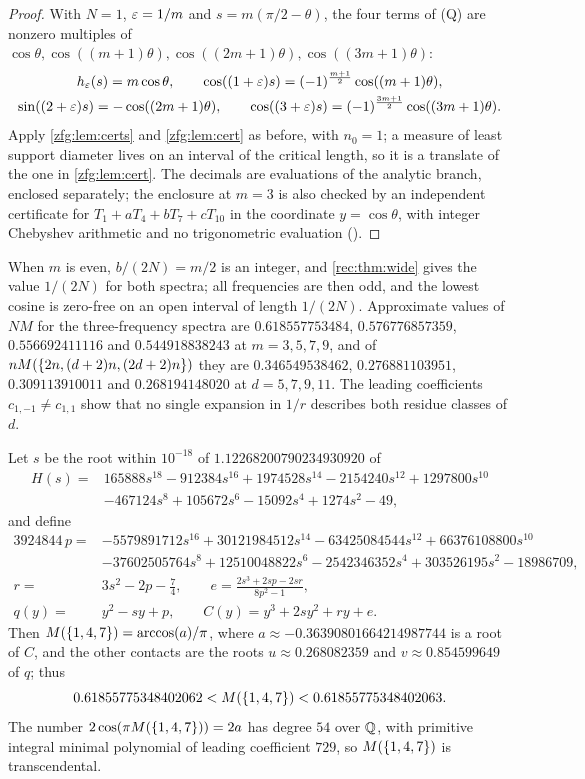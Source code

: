 \begin{proof}
With $N=1$, $\varepsilon=1/m$ and $s=m(\pi/2-\theta)$, the four terms of (Q) are nonzero multiples of
$\cos\theta,\cos((m+1)\theta),\cos((2m+1)\theta),\cos((3m+1)\theta)$:
\begin{gather*}
 h_\varepsilon(s)=m\cos\theta,\qquad \cos((1+\varepsilon)s)=(-1)^{\frac{m+1}2}\cos((m+1)\theta),\\
 \sin((2+\varepsilon)s)=-\cos((2m+1)\theta),\qquad \cos((3+\varepsilon)s)=(-1)^{\frac{3m+1}2}\cos((3m+1)\theta).
\end{gather*}
Apply \cref{zfg:lem:certs} and \cref{zfg:lem:cert} as before, with $n_0=1$; a measure of least support diameter lives on an
interval of the critical length, so it is a translate of the one in \cref{zfg:lem:cert}. The decimals are evaluations
of the analytic branch, enclosed separately; the enclosure at $m=3$ is also checked by an independent certificate for
$T_1+aT_4+bT_7+cT_{10}$ in the coordinate $y=\cos\theta$, with integer Chebyshev arithmetic and no trigonometric evaluation
().
\end{proof}

When $m$ is even, $b/(2N)=m/2$ is an integer, and \cref{rec:thm:wide} gives the value $1/(2N)$ for both spectra; all
frequencies are then odd, and the lowest cosine is zero-free on an open interval of length $1/(2N)$. Approximate
values of $NM$ for the three-frequency spectra are $0.618557753484$, $0.576776857359$, $0.556692411116$ and
$0.544918838243$ at $m=3,5,7,9$, and of $nM(\{2n,(d+2)n,(2d+2)n\})$ they are $0.346549538462$, $0.276881103951$,
$0.309113910011$ and $0.268194148020$ at $d=5,7,9,11$. The leading coefficients $c_{1,-1}\ne c_{1,1}$ show that no single
expansion in $1/r$ describes both residue classes of $d$.

\begin{example}\label{zfg:ex:147}
Let $s$ be the root within $10^{-18}$ of $1.12268200790234930920$ of
\begin{align*}
 H(s)={}&165888s^{18}-912384s^{16}+1974528s^{14}-2154240s^{12}+1297800s^{10}\\
 &-467124s^8+105672s^6-15092s^4+1274s^2-49,
\end{align*}
and define
\begin{align*}
 3924844\,p={}&-5579891712s^{16}+30121984512s^{14}-63425084544s^{12}+66376108800s^{10}\\
 &-37602505764s^8+12510048822s^6-2542346352s^4+303526195s^2-18986709,\\
 r={}&3s^2-2p-\tfrac74,\qquad e=\frac{2s^3+2sp-2sr}{8p^2-1},\\
 q(y)={}&y^2-sy+p,\qquad C(y)=y^3+2sy^2+ry+e.
\end{align*}
Then $M(\{1,4,7\})=\arccos(a)/\pi$, where $a\approx-0.36390801664214987744$ is a root of $C$, and the other contacts are the
roots $u\approx0.268082359$ and $v\approx0.854599649$ of $q$; thus
\[
 0.61855775348402062<M(\{1,4,7\})<0.61855775348402063 .
\]
The number $2\cos(\pi M(\{1,4,7\}))=2a$ has degree $54$ over $\mathbb{Q}$, with primitive integral minimal polynomial of leading
coefficient $729$, so $M(\{1,4,7\})$ is transcendental.
\end{example}


